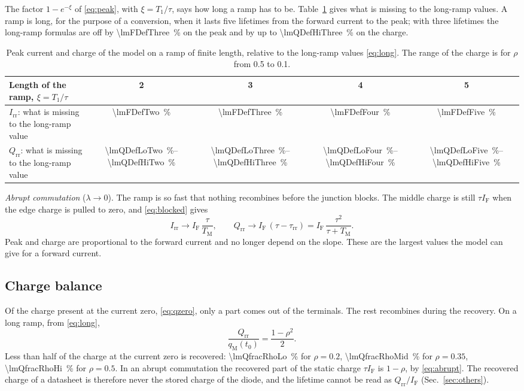 \documentclass[10pt,a4paper]{scrartcl}
\newcommand{\IF}{I_\mathrm{F}}
\newcommand{\Irr}{I_\mathrm{rr}}
\newcommand{\Qrr}{Q_\mathrm{rr}}
\newcommand{\taurr}{\tau_\mathrm{rr}}
\newcommand{\TM}{T_\mathrm{M}}
\newcommand{\Tone}{T_1}
\newcommand{\qM}{q_\mathrm{M}}
\begin{document}
The factor $1 - e^{-\xi}$ of \eqref{eq:peak}, with $\xi = \Tone/\tau$, says how long a ramp has to be. Table~\ref{tab:long} gives what is missing to the long-ramp values. A ramp is long, for the purpose of a conversion, when it lasts five lifetimes from the forward current to the peak; with three lifetimes the long-ramp formulas are off by \SI{\lmFDefThree}{\percent} on the peak and by up to \SI{\lmQDefHiThree}{\percent} on the charge.

\begin{table}[htb]
\centering\small
\caption{Peak current and charge of the model on a ramp of finite length, relative to the long-ramp values \eqref{eq:long}. The range of the charge is for $\rho$ from 0.5 to 0.1.}
\label{tab:long}
\begin{tabular}{@{}lcccc@{}}
\toprule
Length of the ramp, $\xi = \Tone/\tau$ & 2 & 3 & 4 & 5 \\
\midrule
$\Irr$: what is missing to the long-ramp value & \SI{\lmFDefTwo}{\percent} & \SI{\lmFDefThree}{\percent} & \SI{\lmFDefFour}{\percent} & \SI{\lmFDefFive}{\percent} \\
$\Qrr$: what is missing to the long-ramp value & \SIrange{\lmQDefLoTwo}{\lmQDefHiTwo}{\percent} & \SIrange{\lmQDefLoThree}{\lmQDefHiThree}{\percent} & \SIrange{\lmQDefLoFour}{\lmQDefHiFour}{\percent} & \SIrange{\lmQDefLoFive}{\lmQDefHiFive}{\percent} \\
\bottomrule
\end{tabular}
\end{table}

\emph{Abrupt commutation} ($\lambda \to 0$). The ramp is so fast that nothing recombines before the junction blocks. The middle charge is still $\tau\IF$ when the edge charge is pulled to zero, and \eqref{eq:blocked} gives
\begin{equation}
\Irr \to \IF\,\frac{\tau}{\TM} , \qquad \Qrr \to \IF\,(\tau - \taurr) = \IF\,\frac{\tau^2}{\tau+\TM} .
\label{eq:abrupt}
\end{equation}
Peak and charge are proportional to the forward current and no longer depend on the slope. These are the largest values the model can give for a forward current.

\subsection{Charge balance}
Of the charge present at the current zero, \eqref{eq:qzero}, only a part comes out of the terminals. The rest recombines during the recovery. On a long ramp, from \eqref{eq:long},
\begin{equation}
\frac{\Qrr}{\qM(t_0)} = \frac{1-\rho^2}{2} .
\label{eq:fraction}
\end{equation}
Less than half of the charge at the current zero is recovered: \SI{\lmQfracRhoLo}{\percent} for $\rho = 0.2$, \SI{\lmQfracRhoMid}{\percent} for $\rho = 0.35$, \SI{\lmQfracRhoHi}{\percent} for $\rho = 0.5$. In an abrupt commutation the recovered part of the static charge $\tau\IF$ is $1-\rho$, by \eqref{eq:abrupt}. The recovered charge of a datasheet is therefore never the stored charge of the diode, and the lifetime cannot be read as $\Qrr/\IF$ (Sec.~\ref{sec:others}).
\end{document}
